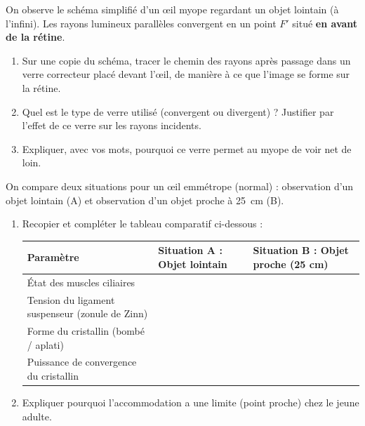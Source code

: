 \documentclass[11pt]{article}
\begin{document}
\begin{exercice}
On observe le schéma simplifié d'un œil myope regardant un objet lointain (à l'infini). Les rayons lumineux parallèles convergent en un point $F'$ situé \textbf{en avant de la rétine}.
\begin{enumerate}
\item Sur une copie du schéma, tracer le chemin des rayons après passage dans un verre correcteur placé devant l'œil, de manière à ce que l'image se forme sur la rétine.
\item Quel est le type de verre utilisé (convergent ou divergent) ? Justifier par l'effet de ce verre sur les rayons incidents.
\item Expliquer, avec vos mots, pourquoi ce verre permet au myope de voir net de loin.
\end{enumerate}
\end{exercice}

\begin{exercice}
On compare deux situations pour un œil emmétrope (normal) : observation d'un objet lointain (A) et observation d'un objet proche à \SI{25}{cm} (B).
\begin{enumerate}
\item Recopier et compléter le tableau comparatif ci-dessous :
\begin{center}
\begin{tabularx}{\linewidth}{|l|X|X|}\hline
\textbf{Paramètre} & \textbf{Situation A : Objet lointain} & \textbf{Situation B : Objet proche (25 cm)} \\ \hline
État des muscles ciliaires & & \\ \hline
Tension du ligament suspenseur (zonule de Zinn) & & \\ \hline
Forme du cristallin (bombé / aplati) & & \\ \hline
Puissance de convergence du cristallin & & \\ \hline
\end{tabularx}
\end{center}
\item Expliquer pourquoi l'accommodation a une limite (point proche) chez le jeune adulte.
\end{enumerate}
\end{exercice}
\end{document}
